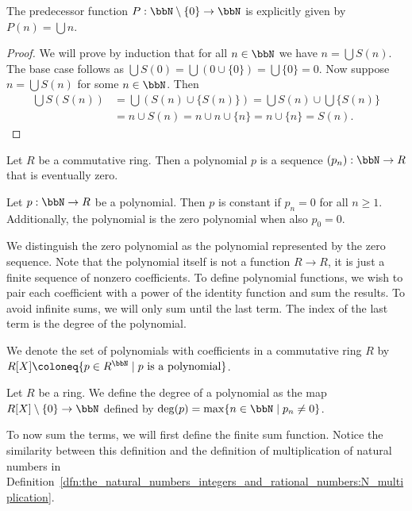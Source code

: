 \begin{lemma}
    The predecessor function $P:\bbN\setminus\{0\}\to\bbN$ is explicitly given by $P(n)=\bigcup n$.
\end{lemma}
\begin{proof}
    We will prove by induction that for all $n\in\bbN$ we have $n=\bigcup S(n)$. The base case follows as $\bigcup S(0)=\bigcup(0\cup\{0\})=\bigcup\{0\}=0$. Now suppose $n=\bigcup S(n)$ for some $n\in\bbN$. Then
    \begin{align*}
        \bigcup S(S(n)) & =\bigcup(S(n)\cup\{S(n)\})=\bigcup S(n)\cup\bigcup\{S(n)\} \\
        & =n\cup S(n)=n\cup n\cup\{n\}=n\cup\{n\}=S(n).
    \end{align*}
\end{proof}
\begin{definition}[Polynomial]
    Let $R$ be a commutative ring. Then a polynomial $p$ is a sequence $(p_n):\bbN\to R$ that is eventually zero.
\end{definition}
\begin{definition}
    Let $p:\bbN\to R$ be a polynomial. Then $p$ is constant if $p_n=0$ for all $n\geq 1$. Additionally, the polynomial is the zero polynomial when also $p_0=0$.
\end{definition}
We distinguish the zero polynomial as the polynomial represented by the zero sequence. Note that the polynomial itself is not a function $R\to R$, it is just a finite sequence of nonzero coefficients. To define polynomial functions, we wish to pair each coefficient with a power of the identity function and sum the results. To avoid infinite sums, we will only sum until the last term. The index of the last term is the degree of the polynomial.
\begin{definition}
    We denote the set of polynomials with coefficients in a commutative ring $R$ by $R[X]\coloneq\{p\in R^\bbN\mid p\text{ is a polynomial}\}$.
\end{definition}
\begin{definition}
    Let $R$ be a ring. We define the degree of a polynomial as the map $R[X]\setminus\{0\}\to\bbN$ defined by $\deg(p)=\max\{n\in\bbN\mid p_n\neq0\}$.
\end{definition}
To now sum the terms, we will first define the finite sum function. Notice the similarity between this definition and the definition of multiplication of natural numbers in Definition~\ref{dfn:the_natural_numbers_integers_and_rational_numbers:N_multiplication}.
